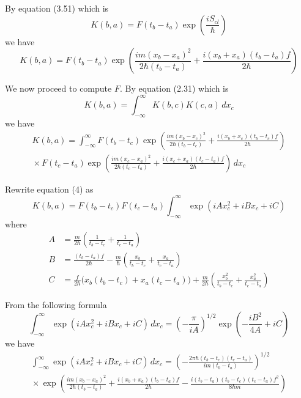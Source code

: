 \documentclass[12pt]{article}
\begin{document}
By equation (3.51) which is
\begin{equation*}
K(b,a)=F(t_b-t_a)\exp\left(\frac{iS_{cl}}{\hbar}\right)
\end{equation*}
we have
\begin{equation*}
K(b,a)=F(t_b-t_a)\exp\left(\frac{im(x_b-x_a)^2}{2\hbar(t_b-t_a)}+\frac{i(x_b+x_a)(t_b-t_a)f}{2\hbar}\right)
\tag{3}
\end{equation*}


We now proceed to compute $F$. By equation (2.31) which is
\begin{equation*}
K(b,a)=\int_{-\infty}^\infty K(b,c)K(c,a)\,dx_c
\end{equation*}
we have
\begin{multline*}
K(b,a)=\int_{-\infty}^\infty
F(t_b-t_c)\exp\left(\frac{im(x_b-x_c)^2}{2\hbar(t_b-t_c)}+\frac{i(x_b+x_c)(t_b-t_c)f}{2\hbar}\right)
\\
{}\times F(t_c-t_a)\exp\left(\frac{im(x_c-x_a)^2}{2\hbar(t_c-t_a)}+\frac{i(x_c+x_a)(t_c-t_a)f}{2\hbar}\right)
\,dx_c
\tag{4}
\end{multline*}


Rewrite equation (4) as
\begin{equation*}
K(b,a)=F(t_b-t_c)F(t_c-t_a)\int_{-\infty}^\infty
\exp(iAx_c^2+iBx_c+iC)
\tag{5}
\end{equation*}
where
\begin{align*}
A&=\frac{m}{2\hbar}\left(\frac{1}{t_b-t_c}+\frac{1}{t_c-t_a}\right)
\tag{6}
\\
B&=\frac{(t_b-t_a)f}{2\hbar}-\frac{m}{\hbar}\left(\frac{x_b}{t_b-t_c}+\frac{x_a}{t_c-t_a}\right)
\tag{7}
\\
C&=\frac{f}{2\hbar}\big(x_b(t_b-t_c)+x_a(t_c-t_a)\big)+\frac{m}{2\hbar}
\left(\frac{x_b^2}{t_b-t_c}+\frac{x_a^2}{t_c-t_a}\right)
\tag{8}
\end{align*}


From the following formula
\begin{equation*}
\int_{-\infty}^{\infty}\exp(iAx_c^2+iBx_c+iC)\,dx_c
=\left(-\frac{\pi}{iA}\right)^{1/2}
\exp\left(-\frac{iB^2}{4A}+iC\right)
\end{equation*}
we have
{\footnotesize
\begin{multline*}
\int_{-\infty}^{\infty}\exp(iAx_c^2+iBx_c+iC)\,dx_c
=\left(-\frac{2\pi\hbar(t_b-t_c)(t_c-t_a)}{im(t_b-t_a)}\right)^{1/2}
\\
{}\times\exp\left(
\frac{im(x_b-x_a)^2}{2\hbar(t_b-t_a)}
+\frac{i(x_b+x_a)(t_b-t_a)f}{2\hbar}
-\frac{i(t_b-t_a)(t_b-t_c)(t_c-t_a)f^2}{8\hbar m}
\right)
\tag{9}
\end{multline*}
}
\end{document}
